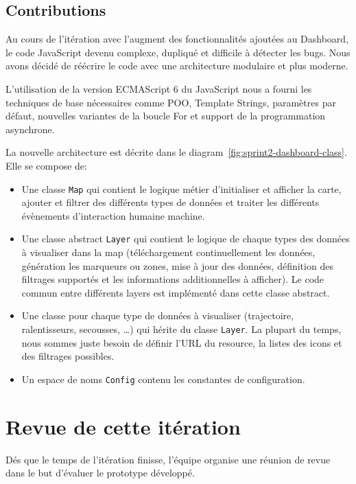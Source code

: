 \subsection{Contributions}

Au cours de l'itération avec l'augment des fonctionnalités ajoutées au
Dashboard, le code JavaScript devenu complexe, dupliqué et difficile à détecter
les bugs. Nous avons décidé de réécrire le code avec une architecture modulaire
et plus moderne.

L'utilisation de la version ECMAScript 6 du JavaScript nous a fourni les
techniques de base nécessaires comme POO, Template Strings, paramètres par
défaut, nouvelles variantes de la boucle For et support de la programmation
asynchrone.

La nouvelle architecture est décrite dans le
diagram~\ref{fig:sprint2-dashboard-class}. Elle se compose de:

\begin{itemize}
    \item Une classe \verb|Map| qui contient le logique métier d'initialiser et
        afficher la carte, ajouter et filtrer des différents types de données
        et traiter les différents évènements d'interaction humaine machine.
    \item Une classe abstract \verb|Layer| qui contient le logique de
        chaque types des données à visualiser dans la map (téléchargement
        continuellement les données, génération les marqueurs ou zones, mise à
        jour des données, définition des filtrages supportés et les
        informations additionnelles à afficher). Le code commun entre
        différents layers est implémenté dans cette classe abstract.
    \item Une classe pour chaque type de données à visualiser (trajectoire,
        ralentisseurs, secousses, \ldots) qui hérite du classe \verb|Layer|. La
        plupart du temps, nous sommes juste besoin de définir l'URL du
        resource, la listes des icons et des filtrages possibles.
    \item Un espace de noms \verb|Config| contenu les constantes de
        configuration.
\end{itemize}

\section{Revue de cette itération}

Dés que le temps de l'itération finisse, l'équipe organise une réunion de revue
dans le but d'évaluer le prototype développé.

